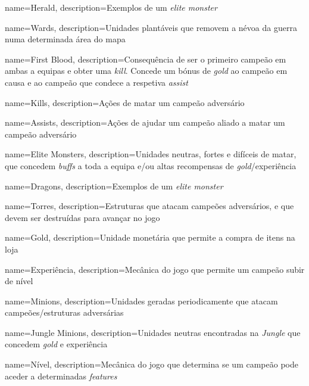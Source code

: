 {
    name=Herald,
    description={Exemplos de um \textit{elite monster}}
}

{
    name=Wards,
    description={Unidades plantáveis que removem a névoa da guerra numa determinada área do mapa}
}

{
    name=First Blood,
    description={Consequência de ser o primeiro campeão em ambas a equipas e obter uma \textit{kill}. Concede um bónus de \textit{gold} ao campeão em causa e ao campeão que condece a respetiva \textit{assist}}
}

{
    name=Kills,
    description={Ações de matar um campeão adversário}
}

{
    name=Assists,
    description={Ações de ajudar um campeão aliado a matar um campeão adversário}
}

{
    name=Elite Monsters,
    description={Unidades neutras, fortes e difíceis de matar, que concedem \textit{buffs} a toda a equipa e/ou altas recompensas de \textit{gold}/experiência}
}

{
    name=Dragons,
    description={Exemplos de um \textit{elite monster}}
}

{
    name=Torres,
    description={Estruturas que atacam campeões adversários, e que devem ser destruídas para avançar no jogo}
}

{
    name=Gold,
    description={Unidade monetária que permite a compra de itens na loja}
}

{
    name=Experiência,
    description={Mecânica do jogo que permite um campeão subir de nível}
}

{
    name=Minions,
    description={Unidades geradas periodicamente que atacam campeões/estruturas adversárias}
}

{
    name=Jungle Minions,
    description={Unidades neutras encontradas na \textit{Jungle} que concedem \textit{gold} e experiência}
}

{
    name=Nível,
    description={Mecânica do jogo que determina se um campeão pode aceder a determinadas \textit{features}}
}